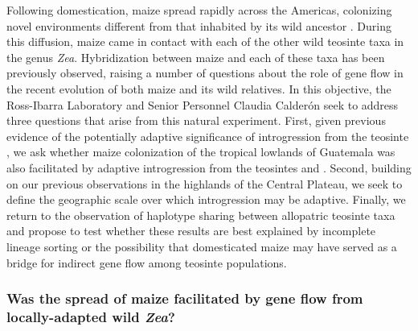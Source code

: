 Following domestication, maize spread rapidly across the Americas, colonizing novel environments different from that inhabited by its wild ancestor \zp. 
During this diffusion, maize came in contact with each of the other wild teosinte taxa in the genus \emph{Zea}.  
Hybridization between maize and each of these taxa has been previously observed, raising a number of questions about the role of gene flow in the recent evolution of both maize and its wild relatives.
In this objective, the Ross-Ibarra Laboratory and Senior Personnel Claudia Calder\'{o}n seek to address three questions that arise from this natural experiment.  
First, given previous evidence of the potentially adaptive significance of introgression from the teosinte \zm, we ask whether maize colonization of the tropical lowlands of Guatemala was also facilitated by adaptive introgression from the teosintes \zl{} and \zh.
Second, building on our previous observations in the highlands of the Central Plateau, we seek to define the geographic scale over which introgression may be adaptive.
Finally, we return to the observation of haplotype sharing between allopatric teosinte taxa \citep{Ross-Ibarra2009a} and propose to test whether these results are best explained by incomplete lineage sorting or the possibility that domesticated maize may have served as a bridge for indirect gene flow among teosinte populations. 

\subsubsection{Was the spread of maize facilitated by gene flow from locally-adapted wild \emph{Zea}?}
\label{sss:adaptive_intro}

